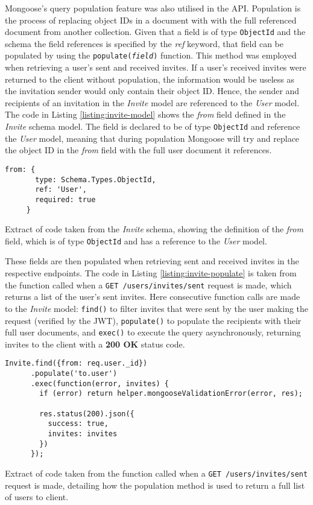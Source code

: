 Mongoose's query population feature was also utilised in the API. Population is the process of replacing object IDs in a document with with the full referenced document from another collection. Given that a field is of type \verb|ObjectId| and the schema the field references is specified by the \textit{ref} keyword, that field can be populated by using the \texttt{populate(\textit{field})} function. This method was employed when retrieving a user's sent and received invites. If a user's received invites were returned to the client without population, the information would be useless as the invitation sender would only contain their object ID. Hence, the sender and recipients of an invitation in the \textit{Invite} model are referenced to the \textit{User} model. The code in Listing \ref{listing:invite-model} shows the \textit{from} field defined in the \textit{Invite} schema model. The field is declared to be of type \verb|ObjectId| and reference the \textit{User} model, meaning that during population Mongoose will try and replace the object ID in the \textit{from} field with the full user document it references.

\begin{listing}
  \centering
  \begin{lstlisting}[style=json]
     from: {
       type: Schema.Types.ObjectId,
       ref: 'User',
       required: true
     }
  \end{lstlisting}
  \caption{Extract of code taken from the \textit{Invite} schema, showing the definition of the \textit{from} field, which is of type \texttt{ObjectId} and has a reference to the \textit{User} model.}
  \label{listing:invite-model}
\end{listing}

These fields are then populated when retrieving sent and received invites in the respective endpoints. The code in Listing \ref{listing:invite-populate} is taken from the function called when a \verb|GET /users/invites/sent| request is made, which returns a list of the user's sent invites. Here consecutive function calls are made to the \textit{Invite} model: \verb|find()| to filter invites that were sent by the user making the request (verified by the JWT), \verb|populate()| to populate the recipients with their full user documents, and \verb|exec()| to execute the query asynchronously, returning invites to the client with a \textbf{200 OK} status code.

\begin{listing}
  \centering
  \begin{lstlisting}[style=json]
Invite.find({from: req.user._id})
      .populate('to.user')
      .exec(function(error, invites) {
        if (error) return helper.mongooseValidationError(error, res);
          
        res.status(200).json({
          success: true,
          invites: invites
        })
      });
  \end{lstlisting}
  \caption{Extract of code taken from the function called when a \texttt{GET /users/invites/sent} request is made, detailing how the population method is used to return a full list of users to client.}
  \label{listing:invite-populate}
\end{listing}

